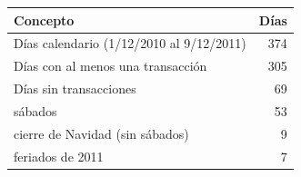 \begin{tabular}{lr}
\toprule
Concepto & Días \\
\midrule
Días calendario (1/12/2010 al 9/12/2011) & 374 \\
Días con al menos una transacción & 305 \\
Días sin transacciones & 69 \\
\quad sábados & 53 \\
\quad cierre de Navidad (sin sábados) & 9 \\
\quad feriados de 2011 & 7 \\
\bottomrule
\end{tabular}
